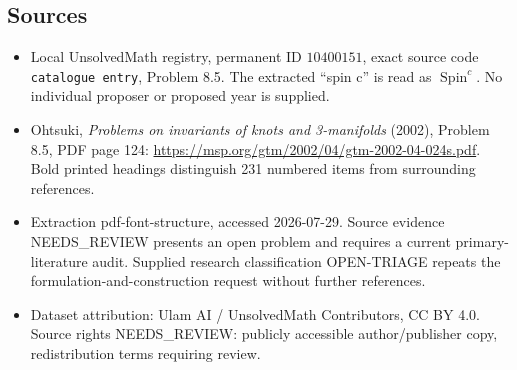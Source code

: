 \documentclass[11pt]{article}
\begin{document}
\subsection{Sources}
\begin{itemize}
\item Local UnsolvedMath registry, permanent ID \(10400151\), exact source code \texttt{catalogue entry}, Problem 8.5. The extracted ``spin c'' is read as \(\operatorname{Spin}^c\). No individual proposer or proposed year is supplied.
\item Ohtsuki, \emph{Problems on invariants of knots and 3-manifolds} (2002), Problem 8.5, PDF page 124: \url{https://msp.org/gtm/2002/04/gtm-2002-04-024s.pdf}. Bold printed headings distinguish 231 numbered items from surrounding references.
\item Extraction pdf-font-structure, accessed 2026-07-29. Source evidence NEEDS\_REVIEW presents an open problem and requires a current primary-literature audit. Supplied research classification OPEN-TRIAGE repeats the formulation-and-construction request without further references.
\item Dataset attribution: Ulam AI / UnsolvedMath Contributors, CC BY 4.0. Source rights NEEDS\_REVIEW: publicly accessible author/publisher copy, redistribution terms requiring review.
\end{itemize}
\end{document}
